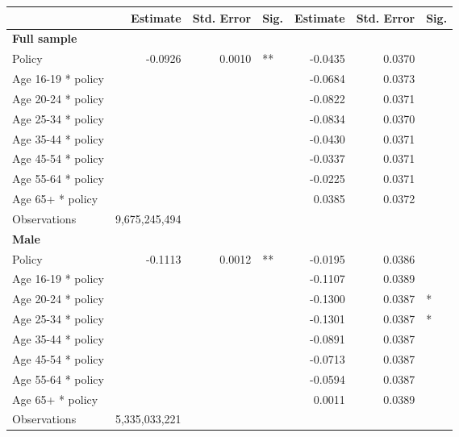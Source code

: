 
\begin{table}%
\centering 
\begin{tabular}{l r r l r r l} 

\hline 
 
 & Estimate & Std. Error & Sig. & Estimate & Std. Error & Sig. \\ 

\hline 
 
\textbf{Full sample} \\ 

Policy             &  -0.0926        &  0.0010       &   **       &  -0.0435        &  0.0370       &            \\ 
Age 16-19 * policy           & & &  &  -0.0684        &  0.0373       &            \\ 
Age 20-24 * policy           & & &  &  -0.0822        &  0.0371       &            \\ 
Age 25-34 * policy           & & &  &  -0.0834        &  0.0370       &            \\ 
Age 35-44 * policy           & & &  &  -0.0430        &  0.0371       &            \\ 
Age 45-54 * policy           & & &  &  -0.0337        &  0.0371       &            \\ 
Age 55-64 * policy           & & &  &  -0.0225        &  0.0371       &            \\ 
Age 65+ * policy           & & &  &  0.0385        &  0.0372       &            \\ 
Observations & 9,675,245,494 \\ 


\hline 

\textbf{Male} \\ 

Policy             &  -0.1113        &  0.0012       &   **       &  -0.0195        &  0.0386       &            \\ 
Age 16-19 * policy           & & &  &  -0.1107        &  0.0389       &            \\ 
Age 20-24 * policy           & & &  &  -0.1300        &  0.0387       &    *       \\ 
Age 25-34 * policy           & & &  &  -0.1301        &  0.0387       &    *       \\ 
Age 35-44 * policy           & & &  &  -0.0891        &  0.0387       &            \\ 
Age 45-54 * policy           & & &  &  -0.0713        &  0.0387       &            \\ 
Age 55-64 * policy           & & &  &  -0.0594        &  0.0387       &            \\ 
Age 65+ * policy           & & &  &  0.0011        &  0.0389       &            \\ 
Observations & 5,335,033,221 \\ 



\end{tabular}
\end{table}
